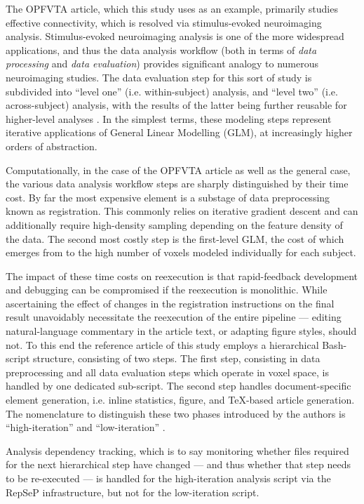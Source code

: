The OPFVTA article, which this study uses as an example, primarily studies effective connectivity, which is resolved via stimulus-evoked neuroimaging analysis.
Stimulus-evoked neuroimaging analysis is one of the more widespread applications, and thus the data analysis workflow (both in terms of \emph{data processing} and \emph{data evaluation}) provides significant analogy to numerous neuroimaging studies.
The data evaluation step for this sort of study is subdivided into “level one” (i.e. within-subject) analysis, and “level two” (i.e. across-subject) analysis, with the results of the latter being further reusable for higher-level analyses \cite{Friston1995}.
In the simplest terms, these modeling steps represent iterative applications of General Linear Modelling (GLM), at increasingly higher orders of abstraction.


Computationally, in the case of the OPFVTA article as well as the general case, the various data analysis workflow steps are sharply distinguished by their time cost.
By far the most expensive element is a substage of data preprocessing known as registration.
This commonly relies on iterative gradient descent and can additionally require high-density sampling depending on the feature density of the data.
The second most costly step is the first-level GLM, the cost of which emerges from to the high number of voxels modeled individually for each subject.

The impact of these time costs on reexecution is that rapid-feedback development and debugging can be compromised if the reexecution is monolithic.
While ascertaining the effect of changes in the registration instructions on the final result unavoidably necessitate the reexecution of the entire pipeline — editing natural-language commentary in the article text, or adapting figure styles, should not.
To this end the reference article of this study employs a hierarchical Bash-script structure, consisting of two steps.
The first step, consisting in data preprocessing and all data evaluation steps which operate in voxel space, is handled by one dedicated sub-script.
The second step handles document-specific element generation, i.e. inline statistics, figure, and TeX-based article generation.
The nomenclature to distinguish these two phases introduced by the authors is “high-iteration” and “low-iteration” \cite{repsep}.

Analysis dependency tracking, which is to say monitoring whether files required for the next hierarchical step have changed — and thus whether that step needs to be re-executed — is handled for the high-iteration analysis script via the RepSeP infrastructure, but not for the low-iteration script.


